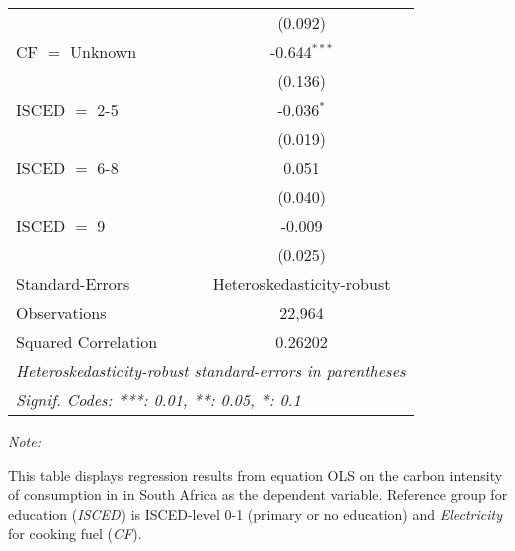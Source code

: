 \begin{table}[htbp!]
\begin{adjustbox}{width = 1\textwidth, max height = 0.95\textheight, center}
\begin{threeparttable}[b]
\begin{tabular}{lc}
                                & (0.092)\\   
            CF $=$ Unknown      & -0.644$^{***}$\\   
                                & (0.136)\\   
            ISCED $=$ 2-5       & -0.036$^{*}$\\   
                                & (0.019)\\   
            ISCED $=$ 6-8       & 0.051\\   
                                & (0.040)\\   
            ISCED $=$ 9         & -0.009\\   
                                & (0.025)\\   
            \midrule 
            Standard-Errors     & Heteroskedasticity-robust \\   
            Observations        & 22,964\\  
            Squared Correlation & 0.26202\\  
            \midrule \midrule
            \multicolumn{2}{l}{\emph{Heteroskedasticity-robust standard-errors in parentheses}}\\
            \multicolumn{2}{l}{\emph{Signif. Codes: ***: 0.01, **: 0.05, *: 0.1}}\\
         \end{tabular}
         
         \begin{tablenotes}\item \medskip \textit{Note:}
            \item This table displays regression results from equation OLS on the carbon intensity of consumption in  in South Africa as the dependent variable. Reference group for education (\textit{ISCED}) is ISCED-level 0-1 (primary or no education) and \textit{Electricity} for cooking fuel (\textit{CF}).
         \end{tablenotes}
      \end{threeparttable}
   \end{adjustbox}
\end{table}


